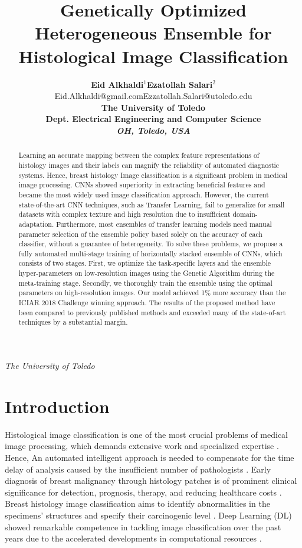 \documentclass[a4paper, 12 pt, conference]{ieeeconf}
\title{\Large \bf Genetically Optimized Heterogeneous Ensemble for Histological Image Classification}
\author{\textbf{Eid Alkhaldi$^{1}$\qquad \bf Ezatollah Salari$^{2}$}\\
		  \small Eid.Alkhaldi@gmail.com\quad Ezzatollah.Salari@utoledo.edu\\

		\large \bf The University of Toledo\\
		 { Dept. Electrical Engineering and Computer Science}\\

		 \small \textit{OH, Toledo, USA}}
\begin{document}
\maketitle

\begin{abstract}
Learning an accurate mapping between the complex feature representations of histology images and their labels can magnify the reliability of automated diagnostic systems. Hence, breast histology Image classification is a significant problem in medical image processing.  CNNs showed superiority in extracting beneficial features and became the most widely used image classification approach. However, the current state-of-the-art CNN techniques, such as Transfer Learning, fail to generalize for small datasets with complex texture and high resolution due to insufficient domain-adaptation. Furthermore, most ensembles of transfer learning models need manual parameter selection of the ensemble policy based solely on the accuracy of each classifier, without a guarantee of heterogeneity. To solve these problems, we propose a fully automated multi-stage training of horizontally stacked ensemble of CNNs, which consists of two stages. First, we optimize the task-specific layers and the ensemble hyper-parameters on low-resolution images using the Genetic Algorithm during the meta-training stage. Secondly, we thoroughly train the ensemble using the optimal parameters on high-resolution images. Our model achieved 1\% more accuracy than the ICIAR 2018 Challenge winning approach. The results of the proposed method have been compared to previously published methods and exceeded many of the state-of-art techniques by a substantial margin.
\end{abstract}
\begin{keywords}
\small \textit{The University of Toledo}
\end{keywords}

\section{Introduction}
\quad Histological image classification is one of the most crucial problems of medical image processing, which demands extensive work and specialized expertise \cite{He2016,Ahmad2019,Pimkin2018}. Hence,  An automated intelligent approach is needed to compensate for the time delay of analysis caused by the insufficient number of pathologists \cite{Cao2018}. Early diagnosis of breast malignancy through histology patches is of prominent clinical significance for detection, prognosis, therapy, and reducing healthcare costs \cite{Brancati2019, AzevedoTosta2017}. Breast histology image classification aims to identify abnormalities in the specimens' structures and specify their carcinogenic level \cite{HeL.;LongLR;AntaniS.andThoma2009}. Deep Learning (DL) showed remarkable competence in tackling image classification over the past years due to the accelerated developments in computational resources \cite{Brancati2019,AzevedoTosta2017,Amidi2018, Pimkin2018}.
\end{document}
